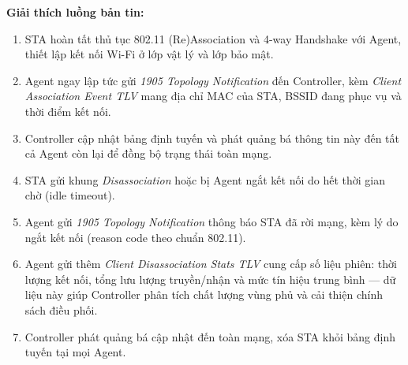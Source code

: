 \begin{center}
\end{center}

\textbf{Giải thích luồng bản tin:}
\begin{enumerate}
	\item STA hoàn tất thủ tục 802.11 (Re)Association và 4-way Handshake với Agent,
	thiết lập kết nối Wi-Fi ở lớp vật lý và lớp bảo mật.
	\item Agent ngay lập tức gửi \textit{1905 Topology Notification} đến Controller,
	kèm \textit{Client Association Event TLV} mang địa chỉ MAC của STA, BSSID
	đang phục vụ và thời điểm kết nối.
	\item Controller cập nhật bảng định tuyến và phát quảng bá thông tin này đến
	tất cả Agent còn lại để đồng bộ trạng thái toàn mạng.
	\item STA gửi khung \textit{Disassociation} hoặc bị Agent ngắt kết nối do hết
	thời gian chờ (idle timeout).
	\item Agent gửi \textit{1905 Topology Notification} thông báo STA đã rời mạng,
	kèm lý do ngắt kết nối (reason code theo chuẩn 802.11).
	\item Agent gửi thêm \textit{Client Disassociation Stats TLV} cung cấp số liệu
	phiên: thời lượng kết nối, tổng lưu lượng truyền/nhận và mức tín hiệu
	trung bình --- dữ liệu này giúp Controller phân tích chất lượng vùng phủ
	và cải thiện chính sách điều phối.
	\item Controller phát quảng bá cập nhật đến toàn mạng, xóa STA khỏi bảng
	định tuyến tại mọi Agent.
\end{enumerate}


